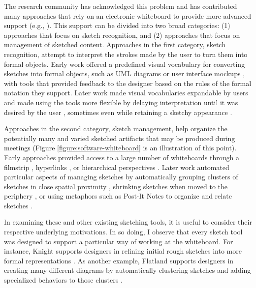 The research community has acknowledged this problem and has contributed many approaches that rely on an electronic whiteboard to provide more advanced support (e.g., \cite{chen2008sumlow, landay1995interactive, hammond2006ladder, damm2000supporting, chung2005inkkit}). This support can be divided into two broad categories: (1) approaches that focus on sketch recognition, and (2) approaches that focus on management of sketched content. Approaches in the first category, sketch recognition, attempt to interpret the strokes made by the user to turn them into formal  objects. Early work offered a predefined visual vocabulary for converting sketches into formal objects, such as UML diagrams \cite{chen2008sumlow} or user interface mockups \cite{landay1995interactive}, with tools that provided feedback to the designer based on the rules of the formal notation they support. Later work made visual vocabularies expandable by users \cite{hammond2006ladder} and made using the tools more flexible by delaying interpretation until it was desired by the user \cite{damm2000supporting}, sometimes even while retaining a sketchy appearance \cite{chung2005inkkit}.

Approaches in the second category, sketch management, help organize the potentially many and varied sketched artifacts that may be produced during meetings (Figure \ref{figure:software-whiteboard} is an illustration of this point). Early approaches provided access to a large number of whiteboards through a filmstrip \cite{stefik1987beyond}, hyperlinks \cite{Streitz:1994:DIM:192844.193044}, or hierarchical perspectives \cite{newman2003denim}. Later work automated particular aspects of managing sketches by automatically grouping clusters of sketches in close spatial proximity \cite{mynatt1999flatland}, shrinking sketches when moved to the periphery \cite{guimbretiere2001fluid}, or using metaphors such as Post-It Notes to organize and relate sketches \cite{klemmer2001designers}.  

In examining these and other existing sketching tools, it is useful to consider their respective underlying motivations. In so doing, I observe that every sketch tool was designed to support a particular way of working at the whiteboard. For instance, Knight supports designers in refining initial rough sketches into more formal representations \cite{damm2000supporting}. As another example, Flatland supports designers in creating many different diagrams by automatically clustering sketches and adding specialized behaviors to those clusters \cite{mynatt1999flatland}.

